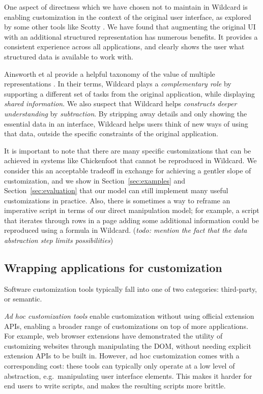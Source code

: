 \documentclass[sigplan,10pt,anonymous,review]{acmart}
\begin{document}
One aspect of directness which we have chosen not to maintain in
Wildcard is enabling customization in the context of the original user
interface, as explored by some other tools like Scotty
\citep{eagan2011}. We have found that augmenting the original UI with an
additional structured representation has numerous benefits. It provides
a consistent experience across all applications, and clearly shows the
user what structured data is available to work with.

Ainsworth et al provide a helpful taxonomy of the value of multiple
representations \citep{ainsworth1999}. In their terms, Wildcard plays a
\emph{complementary role} by supporting a different set of tasks from
the original application, while displaying \emph{shared information}. We
also suspect that Wildcard helps \emph{constructs deeper understanding}
by \emph{subtraction}. By stripping away details and only showing the
essential data in an interface, Wildcard helps users think of new ways
of using that data, outside the specific constraints of the original
application.

It is important to note that there are many specific customizations that
can be achieved in systems like Chickenfoot \citep{bolin2005} that
cannot be reproduced in Wildcard. We consider this an acceptable
tradeoff in exchange for achieving a gentler slope of customization, and
we show in Section~\ref{sec:examples} and Section~\ref{sec:evaluation}
that our model can still implement many useful customizations in
practice. Also, there is sometimes a way to reframe an imperative script
in terms of our direct manipulation model; for example, a script that
iterates through rows in a page adding some additional information could
be reproduced using a formula in Wildcard. (\emph{todo: mention the fact
that the data abstraction step limits possibilities})

\hypertarget{wrapping-applications-for-customization}{%
\subsection{Wrapping applications for
customization}\label{wrapping-applications-for-customization}}

Software customization tools typically fall into one of two categories:
third-party, or semantic.

\emph{Ad hoc customization tools} enable customization without using
official extension APIs, enabling a broader range of customizations on
top of more applications. For example, web browser extensions have
demonstrated the utility of customizing websites through manipulating
the DOM, without needing explicit extension APIs to be built in.
However, ad hoc customization comes with a corresponding cost: these
tools can typically only operate at a low level of abstraction,
e.g.~manipulating user interface elements. This makes it harder for end
users to write scripts, and makes the resulting scripts more brittle.
\end{document}
